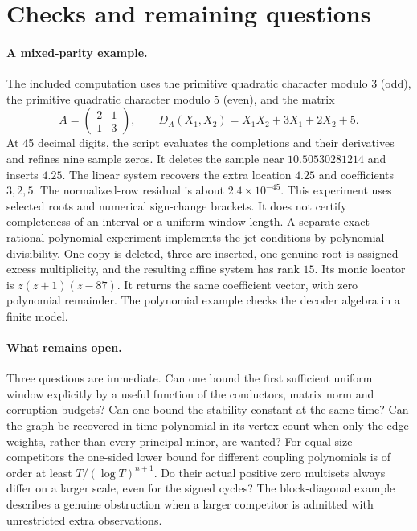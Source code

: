 \documentclass[11pt]{article}
\theoremstyle{remark}\newtheorem{remark}[theorem]{Remark}
\begin{document}


\section{Checks and remaining questions}
\paragraph{A mixed-parity example.}
The included computation uses the primitive quadratic character modulo $3$ (odd), the primitive quadratic character modulo $5$ (even), and the matrix
\[
 A=\begin{pmatrix}2&1\\1&3\end{pmatrix},\qquad
 D_A(X_1,X_2)=X_1X_2+3X_1+2X_2+5.
\]
At 45 decimal digits, the script evaluates the completions and their derivatives and refines nine sample zeros. It deletes the sample near $10.50530281214$ and inserts $4.25$. The linear system recovers the extra location $4.25$ and coefficients $3,2,5$. The normalized-row residual is about $2.4\times10^{-45}$. This experiment uses selected roots and numerical sign-change brackets. It does not certify completeness of an interval or a uniform window length. A separate exact rational polynomial experiment implements the jet conditions by polynomial divisibility. One copy is deleted, three are inserted, one genuine root is assigned excess multiplicity, and the resulting affine system has rank $15$. Its monic locator is $z(z+1)(z-87)$. It returns the same coefficient vector, with zero polynomial remainder. The polynomial example checks the decoder algebra in a finite model.

\paragraph{What remains open.}
Three questions are immediate. Can one bound the first sufficient uniform window explicitly by a useful function of the conductors, matrix norm and corruption budgets? Can one bound the stability constant at the same time? Can the graph be recovered in time polynomial in its vertex count when only the edge weights, rather than every principal minor, are wanted? For equal-size competitors the one-sided lower bound for different coupling polynomials is of order at least $T/(\log T)^{n+1}$. Do their actual positive zero multisets always differ on a larger scale, even for the signed cycles? The block-diagonal example describes a genuine obstruction when a larger competitor is admitted with unrestricted extra observations.
\end{document}
